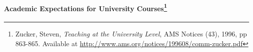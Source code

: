 \documentclass[10pt]{article}
\begin{document}
%
%
%
%
%
%
%
%
%
%
%

\paragraph*{Academic Expectations for University Courses\footnote{Zucker, Steven, \textit{Teaching at the University Level}, AMS Notices (43), 1996, pp 863-865. Available at
\url{http://www.ams.org/notices/199608/comm-zucker.pdf}}}
\end{document}
